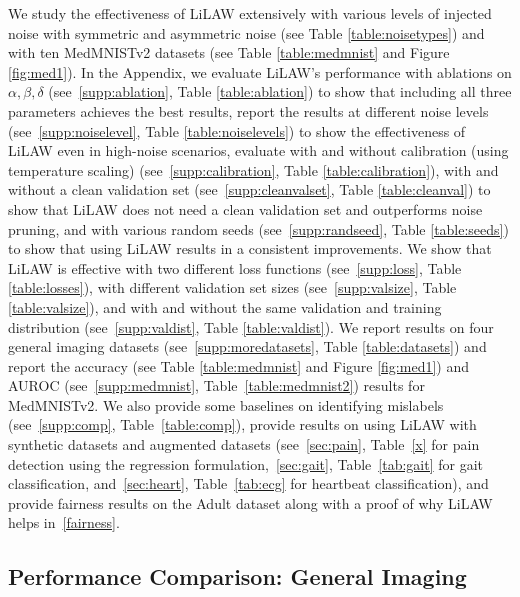 \documentclass{article}
\theoremstyle{plain}
\theoremstyle{definition}
\theoremstyle{remark}
\begin{document}
We study the effectiveness of LiLAW extensively with various levels of injected noise with symmetric and asymmetric noise (see Table \ref{table:noisetypes}) and with ten MedMNISTv2 datasets (see Table \ref{table:medmnist} and Figure \ref{fig:med1}). In the Appendix, we evaluate LiLAW's performance with ablations on $\alpha,\beta,\delta$ (see~\ref{supp:ablation}, Table \ref{table:ablation}) to show that including all three parameters achieves the best results, report the results at different noise levels (see~\ref{supp:noiselevel}, Table \ref{table:noiselevels}) to show the effectiveness of LiLAW even in high-noise scenarios, evaluate with and without calibration (using temperature scaling) (see~\ref{supp:calibration}, Table \ref{table:calibration}), with and without a clean validation set (see~\ref{supp:cleanvalset}, Table \ref{table:cleanval}) to show that LiLAW does not need a clean validation set and outperforms noise pruning, and with various random seeds (see~\ref{supp:randseed}, Table \ref{table:seeds}) to show that using LiLAW results in a consistent improvements.  We show that LiLAW is effective with two different loss functions (see~\ref{supp:loss}, Table \ref{table:losses}), with different validation set sizes (see~\ref{supp:valsize}, Table \ref{table:valsize}), and with and without the same validation and training distribution (see~\ref{supp:valdist}, Table \ref{table:valdist}). We report results on four general imaging datasets (see~\ref{supp:moredatasets}, Table \ref{table:datasets}) and report the accuracy (see Table \ref{table:medmnist} and Figure \ref{fig:med1}) and AUROC (see~\ref{supp:medmnist}, Table~\ref{table:medmnist2}) results for MedMNISTv2. We also provide some baselines on identifying mislabels (see~\ref{supp:comp}, Table~\ref{table:comp}), provide results on using LiLAW with synthetic datasets and augmented datasets (see~\ref{sec:pain}, Table~\ref{x} for pain detection using the regression formulation,~\ref{sec:gait}, Table~\ref{tab:gait} for gait classification, and~\ref{sec:heart}, Table~\ref{tab:ecg} for heartbeat classification), and provide fairness results on the Adult dataset along with a proof of why LiLAW helps in~\ref{fairness}.


\subsection{Performance Comparison: General Imaging}
\end{document}
